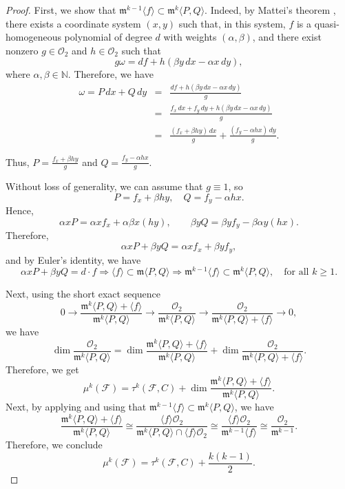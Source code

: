 \documentclass[12pt,letterpaper]{amsart}
\newcommand{\m}{\mathfrak{m}}
\begin{document}
\begin{proof}
First, we show that $\m^{k-1}\langle f\rangle\subset \m^k\langle P,Q\rangle$.
Indeed, by Mattei’s theorem \cite[Th\'eor\`eme~A]{quasiMattei}, there exists a coordinate system $(x, y)$ such that, in this system, $f$ is a quasi-homogeneous polynomial of degree $d$ with weights $(\alpha, \beta)$, and there exist nonzero $g \in \mathcal{O}_2$ and $h \in \mathcal{O}_2$ such that 
\[
g\omega = df + h(\beta y\,dx - \alpha x\,dy),
\]
where $\alpha, \beta \in \mathbb{N}$. Therefore, we have
\begin{eqnarray*}
    \omega = P\,dx + Q\,dy &=& \frac{df + h(\beta y\,dx - \alpha x\,dy)}{g}\\
    &=& \frac{f_x\,dx + f_y\,dy + h(\beta y\,dx - \alpha x\,dy)}{g}\\
    &=& \frac{(f_x+ \beta h y)\,dx}{g} + \frac{(f_y - \alpha h x)\,dy}{g}.
\end{eqnarray*}

Thus, $P = \frac{f_x+ \beta h y}{g}$ and $Q = \frac{f_y - \alpha h x}{g}$.

Without loss of generality, we can assume that $g \equiv 1$, so 
\[
P = f_x+ \beta h y, \quad 
Q = f_y - \alpha h x.
\]
Hence,
\[
\alpha x P = \alpha x f_x+ \alpha\beta x (h y), \qquad 
\beta y Q = \beta y f_y - \beta\alpha y(h x).
\]
Therefore, 
\[
\alpha x P + \beta y Q = \alpha x f_x+ \beta y  f_y,
\]
and by Euler’s identity, we have 
\[
\alpha x P + \beta y Q = d \cdot f 
\Longrightarrow 
\langle f \rangle \subset \m\langle P, Q \rangle 
\Longrightarrow 
\m^{k-1} \langle f \rangle \subset \m^{k} \langle P, Q \rangle, 
\quad \text{for all } k \geq 1.
\]

\par Next, using the short exact sequence
\[
0 \longrightarrow \frac{ \m^{k} \langle P,Q \rangle + \langle f \rangle}{\m^{k} \langle P,Q \rangle} 
\longrightarrow 
\frac{\mathcal{O}_{2}}{\m^{k} \langle P,Q \rangle} 
\longrightarrow 
\frac{\mathcal{O}_{2}}{\m^{k} \langle P,Q \rangle + \langle f \rangle} 
\longrightarrow 0,
\]
we have 
\[
\dim \frac{\mathcal{O}_{2}}{\m^{k} \langle P, Q\rangle}  
= 
\dim  \frac{ \m^{k} \langle P,Q \rangle + \langle f \rangle}{\m^{k} \langle P,Q \rangle}  
+ 
\dim  \frac{\mathcal{O}_{2}}{\m^{k} \langle P,Q \rangle + \langle f \rangle}.
\]  
Therefore, we get
\[
\mu^{k} (\mathcal{F}) = \tau^{k}(\mathcal{F}, C) + \dim \frac{ \m^{k} \langle P,Q \rangle + \langle f \rangle}{\m^{k} \langle P,Q \rangle}.
\]
Next, by applying \cite[Lemma~2.5]{k-Milnor} and using that \( \m^{k-1} \langle f \rangle \subset \m^{k} \langle P,Q \rangle \), we have
\[
\frac{ \m^{k} \langle P,Q \rangle + \langle f \rangle}{\m^{k} \langle P,Q \rangle} 
\cong 
\frac{\langle f \rangle \mathcal{O}_{2}}{\m^{k} \langle P,Q \rangle \cap \langle f \rangle \mathcal{O}_{2}} 
\cong 
\frac{\langle f \rangle \mathcal{O}_{2}}{\m^{k-1} \langle f \rangle} 
\cong 
\frac{\mathcal{O}_{2}}{\m^{k-1}}.
\]
Therefore, we conclude
\[
\mu^{k}(\mathcal{F}) = \tau^{k}(\mathcal{F}, C) +  \frac{k(k-1)}{2}.
\]
\end{proof}
\end{document}
